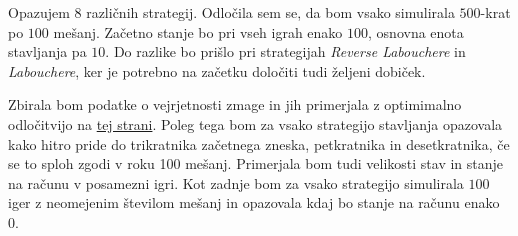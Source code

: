 \documentclass[a4paper, 16pt]{article}
\begin{document}
Opazujem 8 različnih strategij. Odločila sem se, da bom vsako simulirala $500$-krat po $100$ mešanj. Začetno stanje bo pri vseh igrah enako $100$, osnovna enota stavljanja pa $10$. Do razlike bo prišlo pri strategijah \textit{Reverse Labouchere} in \textit{Labouchere}, ker je potrebno na začetku določiti tudi željeni dobiček.

Zbirala bom podatke o vejrjetnosti zmage in jih primerjala z optimimalno odločitvijo na \href{https://www.blackjackapprenticeship.com/blackjack-strategy-charts/}{tej strani}. Poleg tega bom za vsako strategijo stavljanja opazovala kako hitro pride do trikratnika začetnega zneska, petkratnika in desetkratnika, če se to sploh zgodi v roku 100 mešanj. Primerjala bom tudi velikosti stav in stanje na računu v posamezni igri. 
Kot zadnje bom za vsako strategijo simulirala $100$ iger z neomejenim številom mešanj in opazovala kdaj bo stanje na računu enako 0. 
\end{document}
